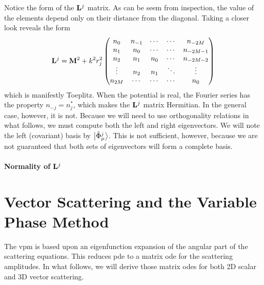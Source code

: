 Notice the form of the $\mathbf{L}^j$ matrix. As can be seem from inspection, 
the value of the elements depend only on their distance from the diagonal.
Taking a closer look reveals the form
  \begin{equation}
   \mathbf{L}^j = \mathbf{M}^2 +k^2r_j^2\begin{pmatrix} 
		  n_0 & n_{-1} & \cdots & \cdots & n_{-2M}	\\
		  n_1	  & n_0& \cdots & \cdots & n_{-2M-1}\\
		  n_2	  & n_1	   & n_0& \cdots & n_{-2M-2}\\
		  \vdots  & n_2    & n_1    & \ddots & \vdots   \\
		  n_{2M}  & \cdots & \cdots & \cdots & n_0
		\end{pmatrix}
  \end{equation}
which is manifestly Toeplitz. When the potential is real, the Fourier
series has the property $n_{-j}=n_j^*$, which makes the $\mathbf{L}^j$ 
matrix Hermitian. In the general case, however, it is not. Because
we will need to use orthogonality relations in what follows, we must
compute both the left and right eigenvectors. 
We will note the left (covariant) basis by $\Ket{\tilde{\Phi}_\mu^j}$.
This is not sufficient, however, because we are not guaranteed that
both sets of eigenvectors will form a complete basis. 

\paragraph{Normality of $\mathbf{L}^j$}

\section{Vector Scattering and the Variable Phase Method}\label{sec:app.numTools.vpm}
The \gls{vpm} is based upon an eigenfunction expansion of the 
angular part of the scattering equations. This reduces \gls{pde}
to a matrix \gls{ode} for the scattering amplitudes. In what
follows, we will derive those matrix \glspl{ode} for both 
2D scalar and 3D vector scattering. 

